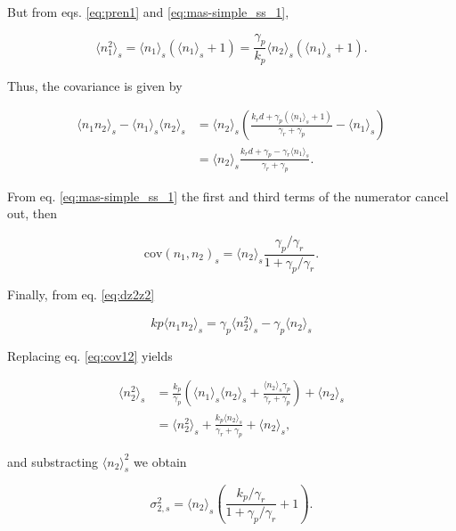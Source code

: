 But from eqs. \eqref{eq:pren1} and \eqref{eq:mas-simple_ss_1},

\begin{equation}
\langle n_1^2 \rangle_s = \langle n_1 \rangle_s\left( \langle n_1 \rangle_s+1\right) = \frac{\gamma_p}{k_p}\langle n_2 \rangle_s\left(\langle n_1\rangle_s + 1\right).
\end{equation}

Thus, the covariance is given by

\begin{align*}
  \langle n_1n_2 \rangle_s - \langle n_1 \rangle_s\langle n_2\rangle_s &= \langle n_2 \rangle_s \left(\frac{k_rd+\gamma_p\left(\langle n_1\rangle_s+1\right)}{\gamma_r+\gamma_p}-\langle n_1\rangle_s\right)\\
  &=\langle n_2\rangle_s\frac{k_rd+\gamma_p-\gamma_r\langle n_1\rangle_s}{\gamma_r+\gamma_p}.
\end{align*}

From eq. \eqref{eq:mas-simple_ss_1} the first and third terms of the numerator cancel out, then

\begin{equation}
  \label{eq:cov12}
  \text{cov}(n_1,n_2)_s = \langle n_2 \rangle_s\frac{\gamma_p/\gamma_r}{1+\gamma_p/\gamma_r}.
\end{equation}

Finally, from eq. \eqref{eq:dz2z2}

\begin{equation*}
kp\langle n_1n_2\rangle_s = \gamma_p\langle n_2^2\rangle_s-\gamma_p\langle n_2\rangle_s
\end{equation*}

Replacing eq. \eqref{eq:cov12} yields

\begin{align*}
  \langle n_2^2\rangle_s &= \frac{k_p}{\gamma_p}\left(\langle n_1 \rangle_s\langle n_2\rangle_s + \frac{\langle n_2\rangle_s\gamma_p}{\gamma_r+\gamma_p}\right) + \langle n_2 \rangle_s\\
  &=\langle n_2^2\rangle_s+\frac{k_p\langle n_2\rangle_s}{\gamma_r+\gamma_p}+\langle n_2 \rangle_s,
\end{align*}

and substracting $\langle n_2\rangle_s^2$ we obtain

\begin{equation*}
  \sigma_{2,s}^2 = \langle n_2\rangle_s\left(\frac{k_p/\gamma_r}{1+\gamma_p/\gamma_r}+1\right).
\end{equation*}

